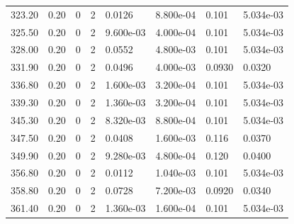 \documentclass[preview]{standalone}
\begin{document}
{{{\begin{tabular}{L{1.2cm}C{1.2cm} C{0.3cm}C{0.5cm} C{1.4cm}C{1.4cm} C{1.4cm}C{1.4cm}}
  323.20  &  0.20  & 0     &  2 &  0.0126  & 8.800e-04  & 0.101 &  5.034e-03   \\ 
  325.50  &  0.20  & 0     &  2 &  9.600e-03  & 4.000e-04  & 0.101 &  5.034e-03   \\ 
  328.00  &  0.20  & 0     &  2 &  0.0552  & 4.800e-03  & 0.101 &  5.034e-03   \\ 
  331.90  &  0.20  & 0     &  2 &  0.0496  & 4.000e-03  & 0.0930 &  0.0320   \\ 
  336.80  &  0.20  & 0     &  2 &  1.600e-03  & 3.200e-04  & 0.101 &  5.034e-03   \\ 
  339.30  &  0.20  & 0     &  2 &  1.360e-03  & 3.200e-04  & 0.101 &  5.034e-03   \\ 
  345.30  &  0.20  & 0     &  2 &  8.320e-03  & 8.800e-04  & 0.101 &  5.034e-03   \\ 
  347.50  &  0.20  & 0     &  2 &  0.0408  & 1.600e-03  & 0.116 &  0.0370   \\ 
  349.90  &  0.20  & 0     &  2 &  9.280e-03  & 4.800e-04  & 0.120 &  0.0400   \\ 
  356.80  &  0.20  & 0     &  2 &  0.0112  & 1.040e-03  & 0.101 &  5.034e-03   \\ 
  358.80  &  0.20  & 0     &  2 &  0.0728  & 7.200e-03  & 0.0920 &  0.0340   \\ 
  361.40  &  0.20  & 0     &  2 &  1.360e-03  & 1.600e-04  & 0.101 &  5.034e-03   \\ 
\hline 
\end{tabular} 

}}}
\end{document}
